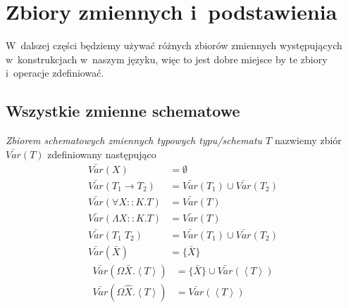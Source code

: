 \documentclass[11pt,leqno]{article}
\begin{document}
\section{Zbiory zmiennych i~podstawienia}

W~dalszej części będziemy używać różnych zbiorów zmiennych występujących w~konstrukcjach w~naszym języku, więc
to jest dobre miejsce by te zbiory i~operacje zdefiniować.

\subsection{Wszystkie zmienne schematowe}

\begin{definicja}
\emph{Zbiorem schematowych zmiennych typowych typu/schematu $T$} nazwiemy zbiór $\bar{Var}(T)$ zdefiniowany następująco
\begin{align*}
\bar{Var}(X) & = \emptyset \\
\bar{Var}(T_1 \to T_2) & = \bar{Var}(T_1) \cup \bar{Var}(T_2) \\
\bar{Var}(\forall X :: K.T) & = \bar{Var}(T) \\
\bar{Var}(\Lambda X :: K.T) & = \bar{Var}(T) \\
\bar{Var}(T_1 \; T_2) & = \bar{Var}(T_1) \cup \bar{Var}(T_2) \\
\bar{Var}(\bar{X}) & = \{ \bar{X} \}
\end{align*}
\begin{align*}
\bar{Var}(\Omega \bar{X}.\left<T\right>) & = \{ \bar{X} \} \cup \bar{Var}(\left<T\right>) \\
\bar{Var}(\Omega \widehat{X}.\left<T\right>) & = \bar{Var}(\left<T\right>)
\end{align*}
\end{definicja}
\end{document}
